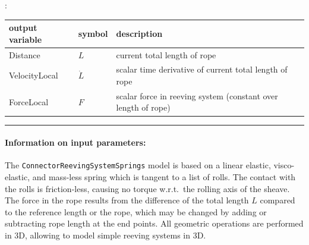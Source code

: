 :
\begin{center}
\footnotesize
\begin{longtable}{| p{5cm} | p{5cm} | p{6cm} |} 
\hline
\bf output variable & \bf symbol & \bf description \\ \hline
Distance & $L$ & current total length of rope\\ \hline
VelocityLocal & $\dot L$ & scalar time derivative of current total length of rope\\ \hline
ForceLocal & $F$ & scalar force in reeving system (constant over length of rope)\\ \hline
\end{longtable}
\end{center}
\par\noindent\rule{\textwidth}{0.4pt}
\label{description_ObjectConnectorReevingSystemSprings}
\paragraph{Information on input parameters:} 
\finishTable
 \noindent
    The \texttt{ConnectorReevingSystemSprings} model is based on a linear elastic, visco-elastic, and mass-less spring which
    is tangent to a list of rolls. The contact with the rolls is friction-less, causing no torque w.r.t.\ the rolling axis of the sheave.
    The force in the rope results from the difference of the total length $L$ compared to the reference length or the rope, which 
    may be changed by adding or subtracting rope length at the end points. All geometric operations are performed in 3D, allowing to model
    simple reeving systems in 3D.
    
